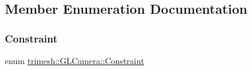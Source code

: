 \subsection{Member Enumeration Documentation}
\mbox{\label{classtrimesh_1_1GLCamera_a4b7300c68956c148f6f8b014217faed9}} 
\subsubsection{\texorpdfstring{Constraint}{Constraint}}
{\footnotesize\ttfamily enum \hyperlink{classtrimesh_1_1GLCamera_a4b7300c68956c148f6f8b014217faed9}{trimesh\+::\+G\+L\+Camera\+::\+Constraint}}

